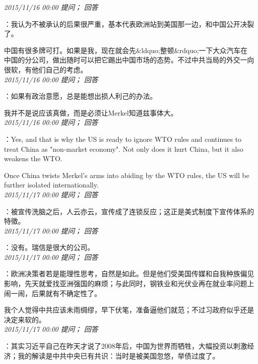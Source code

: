 \documentclass[twocolumn]{ctexart}
\begin{document}
\textit{\hfill\noindent\small 2015/11/16 00:00 提问； 回答}

：我认为不被承认的后果很严重，基本代表欧洲站到美国那一边，和中国公开决裂了。

中国有很多牌可打。如果是我，现在就会先\&ldquo;整顿\&rdquo;一下大众汽车在中国的分公司，做出随时可以把它踢出中国市场的态势。不过中共当局的外交一向很软，有他们自己的考虑。\\

\textit{\hfill\noindent\small 2015/11/16 00:00 提问； 回答}

：如果有政治意愿，总是能想出损人利己的办法。

我并不是说应该真做，而是必须让Merkel知道兹事体大。\\

\textit{\hfill\noindent\small 2015/11/16 00:00 提问； 回答}

：Yes, and that is why the US is ready to ignore WTO rules and continues to treat China as "non-market economy". Not only does it hurt China, but it also weakens the WTO.

Once China twists Merkel's arms into abiding by the WTO rules, the US will be further isolated internationally.\\

\textit{\hfill\noindent\small 2015/11/17 00:00 提问； 回答}

：被宣传洗脑之后，人云亦云，宣传成了连锁反应；这正是美式制度下宣传体系的特徵。\\

\textit{\hfill\noindent\small 2015/11/17 00:00 提问； 回答}

：没有。瑞信是很大的公司。\\

\textit{\hfill\noindent\small 2015/11/17 00:00 提问； 回答}

：欧洲决策者若是能理性思考，自然是如此。但是他们受美国传媒和自我种族偏见影响，先天就爱找亚洲强国的麻烦；与此同时，钢铁业和光伏业再在就业率问题上闹一闹，后果就有不确定性了。

我个人觉得中共应该未雨绸缪，早下伏笔，准备逼他们就范；不过习政府似乎还是决定来软的。\\

\textit{\hfill\noindent\small 2015/11/17 00:00 提问； 回答}

：其实习近平自己在昨天才说了2008年后，中国为世界而牺牲，大幅投资以刺激经济；我的解读是中共中央已有共识：当时是被美国忽悠，举债过度了。
\end{document}
